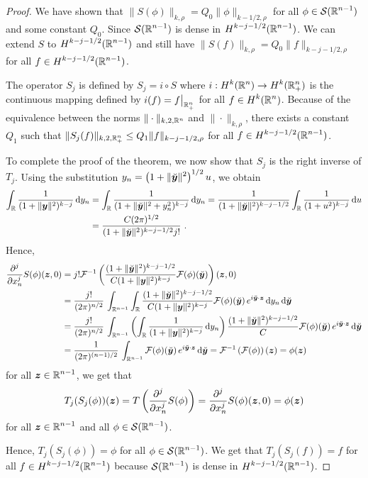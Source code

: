 \begin{proof}
We have shown that $\|S(\phi)\|_{k,\rho} = Q_0 \|\phi\|_{k-1/2,\rho}$
for all $\displaystyle \phi \in \SS(\RR^{n-1})$ and some constant $Q_0$.
Since $\displaystyle \SS(\RR^{n-1})$ is dense in
$\displaystyle H^{k-j-1/2}(\RR^{n-1})$.  We can
extend $S$ to $\displaystyle H^{k-j-1/2}(\RR^{n-1})$ and still
have $\displaystyle \|S(f)\|_{k,\rho} = Q_0 \|f\|_{k-j-1/2,\rho}$ for all
$\displaystyle f \in H^{k-j-1/2}(\RR^{n-1})$.

The operator $S_j$ is defined by $S_j = i \circ S$ where
$\displaystyle i: H^{k}(\RR^n) \to H^{k}(\RR^n_+)$ is the
continuous mapping defined by $\displaystyle i(f) = f\big|_{\RR^n_+}$ for all
$\displaystyle f \in H^{k}(\RR^n)$.  Because of the equivalence between the
norms $\|\cdot\|_{k,2,\RR^n}$ and $\|\cdot\|_{k,\rho}$, there exists a
constant $Q_1$ such that
$\displaystyle \|S_j(f)\|_{k,2,\RR^n_+} \leq Q_1 \|f\|_{k-j-1/2,\rho}$ for all
$\displaystyle f \in H^{k-j-1/2}(\RR^{n-1})$.

To complete the proof of the theorem, we now show
that $S_j$ is the right inverse of $T_j$.
Using the substitution
$\displaystyle y_n = \left(1 + \|\breve{\VEC{y}}\|^2\right)^{1/2} u$, we
obtain
\begin{align*}
\int_{\RR} \frac{1}{(1 + \|\VEC{y}\|^2)^{k-j}} \dx{y_n}
&= \int_{\RR} \frac{1}{(1 + \|\breve{\VEC{y}}\|^2 + y_n^2)^{k-j}} \dx{y_n}
= \frac{1}{(1 + \|\breve{\VEC{y}}\|^2)^{k-j-1/2}}
\int_{\RR} \frac{1}{(1 + u^2)^{k-j}} \dx{u} \\
&= \frac{C (2\pi)^{1/2}}{(1 + \|\breve{\VEC{y}}\|^2)^{k-j-1/2} j!} \ .
\end{align*}
Hence,
\begin{align*}
\pdfdxn{S(\phi)}{x_n}{j}(\VEC{z},0)
&= j! \F^{-1}\left(
\frac{(1+\|\breve{\VEC{y}}\|^2)^{k-j-1/2}}{C(1+ \|\VEC{y}\|^2)^{k-j}}
\F(\phi)(\breve{\VEC{y}}) \right)(\VEC{z},0) \\
&= \frac{j!}{(2\pi)^{n/2}}\,\int_{\RR^{n-1}} \int_{\RR} 
\frac{(1+\|\breve{\VEC{y}}\|^2)^{k-j-1/2}}{C(1+ \|\VEC{y}\|^2)^{k-j}}
\F(\phi)(\breve{\VEC{y}})\, e^{i\breve{\VEC{y}}\cdot \VEC{z}}
\dx{y_n} \dx{\breve{\VEC{y}}} \\
&= \frac{j!}{(2\pi)^{n/2}}\,\int_{\RR^{n-1}} \left(
\int_{\RR} \frac{1}{(1+ \|\VEC{y}\|^2)^{k-j}} \dx{y_n} \right)
\frac{(1+\|\breve{\VEC{y}}\|^2)^{k-j-1/2}}{C}
\F(\phi)(\breve{\VEC{y}})\, e^{i\breve{\VEC{y}}\cdot \VEC{z}}
\dx{\breve{\VEC{y}}} \\
&= \frac{1}{(2\pi)^{(n-1)/2}}\,\int_{\RR^{n-1}}
\F(\phi)(\breve{\VEC{y}})\, e^{i\breve{\VEC{y}}\cdot \VEC{z}}
\dx{\breve{\VEC{y}}} = \F^{-1}\left(\F(\phi)\right)(\VEC{z})
= \phi(\VEC{z})
\end{align*}
for all $\displaystyle \VEC{z} \in \RR^{n-1}$, we get that
\[
  T_j(S_j(\phi))(\VEC{z}) = T \left( \pdfdxn{S(\phi)}{x_n}{j} \right)
  = \pdfdxn{S(\phi)}{x_n}{j}(\VEC{z},0) = \phi(\VEC{z})
\]
for all $\displaystyle \VEC{z} \in \RR^{n-1}$ and all
$\displaystyle \phi \in \SS(\RR^{n-1})$.

Hence, $T_j(S_j(\phi)) = \phi$ for all
$\displaystyle \phi \in \SS(\RR^{n-1})$.  We get
that $T_j(S_j(f)) = f$ for all $f \in \displaystyle H^{k-j-1/2}(\RR^{n-1})$
because $\displaystyle \SS(\RR^{n-1})$ is dense in
$\displaystyle H^{k-j-1/2}(\RR^{n-1})$.
\end{proof}

